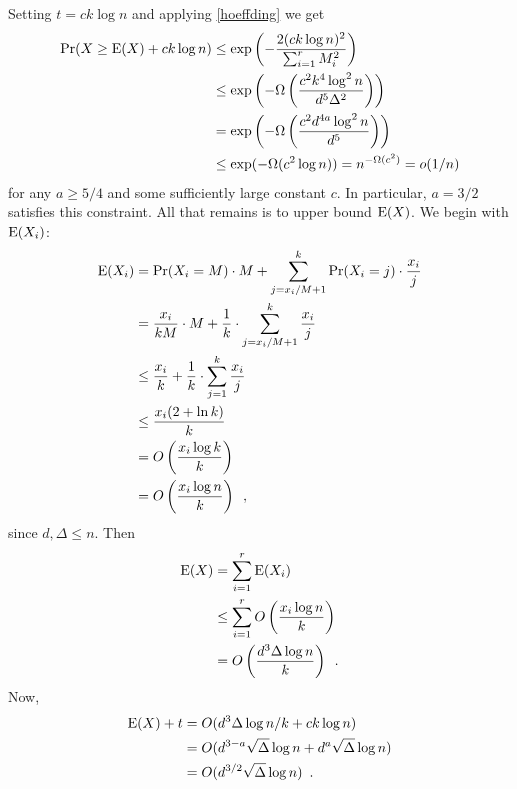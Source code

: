 \documentclass{patmorin}
\begin{document}

Setting $t=ck\log n$ and applying \cref{hoeffding} we get
\begin{align*}
  \Pr(X\ge \mathrm{E}(X) + ck\log n)
  & \le \exp\left(-\frac{2(ck\log n)^2}{\sum_{i=1}^r M_i^2}\right) \\
  & \le \exp\left(-\Omega\left(\frac{c^2k^4\log^2 n}{d^5\Delta^2}\right)\right) \\
  & = \exp\left(-\Omega\left(\frac{c^2d^{4a}\log^{2} n}{d^5}\right)\right) \\
  & \le \exp(-\Omega(c^2\log n)) = n^{-\Omega(c^2)} = o(1/n)
\end{align*}
for any $a\ge 5/4$ and some sufficiently large constant $c$.  In particular, $a=3/2$ satisfies this constraint.  All that remains is to upper bound $\mathrm{E}(X)$.  We begin with $\mathrm{E}(X_i)$:
\begin{align*}
  \mathrm{E}(X_i)
  & =\Pr(X_i=M)\cdot M + \sum_{j=x_i/M+1}^k \Pr(X_i=j)\cdot\frac{x_i}{j} \\
  & =\frac{x_i}{kM}\cdot M + \frac{1}{k}\cdot\sum_{j=x_i/M+1}^k \frac{x_i}{j} \\
  & \le \frac{x_i}{k} + \frac{1}{k}\cdot\sum_{j=1}^k \frac{x_i}{j} \\
  & \le \frac{x_i(2+\ln k)}{k} \\
  & = O\left(\frac{x_i\log k}{k}\right) \\
  & = O\left(\frac{x_i\log n}{k}\right)
  \enspace ,
\end{align*}
since $d,\Delta\le n$.  Then
\begin{align*}
  \mathrm{E}(X) & = \sum_{i=1}^r\mathrm{E}(X_i) \\
  & \le \sum_{i=1}^r O\left(\frac{x_i\log n}{k}\right) \\
  & = O\left(\frac{d^3\Delta\log n}{k}\right)
   \enspace .
\end{align*}
Now,
\begin{align*}
  \mathrm{E}(X)+t & = O(d^3\Delta\log n/k + ck\log n) \\
  & = O(d^{3-a}\sqrt{\Delta}\log n + d^a\sqrt{\Delta}\log n) \\
  & = O(d^{3/2}\sqrt{\Delta}\log n) \enspace .
\end{align*}
\end{document}
